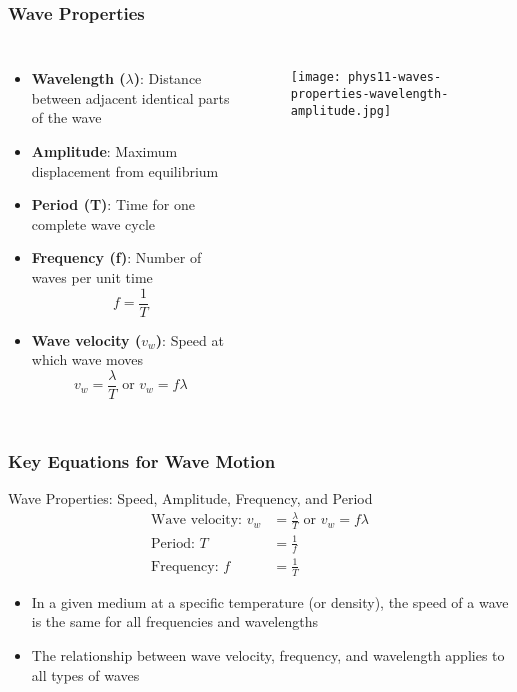 \documentclass{beamer}
\begin{document}
\begin{frame}
\frametitle{Wave Properties}
\begin{columns}
\begin{itemize}
\item \textbf{Wavelength ($\lambda$)}: Distance between adjacent identical parts of the wave
\item \textbf{Amplitude}: Maximum displacement from equilibrium
\item \textbf{Period (T)}: Time for one complete wave cycle
\item \textbf{Frequency (f)}: Number of waves per unit time
\begin{equation}
f = \frac{1}{T}
\end{equation}
\item \textbf{Wave velocity ($v_w$)}: Speed at which wave moves
\begin{equation}
v_w = \frac{\lambda}{T} \text{ or } v_w = f\lambda
\end{equation}
\end{itemize}

\begin{figure}
    \centering
    \texttt{[image: phys11-waves-properties-wavelength-amplitude.jpg]}
\end{figure}
\end{columns}
\end{frame}

\begin{frame}
\frametitle{Key Equations for Wave Motion}
\begin{block}{Wave Properties: Speed, Amplitude, Frequency, and Period}
\begin{align}
\text{Wave velocity: } v_w &= \frac{\lambda}{T} \text{ or } v_w = f\lambda \\
\text{Period: } T &= \frac{1}{f} \\
\text{Frequency: } f &= \frac{1}{T}
\end{align}
\end{block}

\begin{itemize}
\item In a given medium at a specific temperature (or density), the speed of a wave is the same for all frequencies and wavelengths
\item The relationship between wave velocity, frequency, and wavelength applies to all types of waves
\end{itemize}
\end{frame}
\end{document}
